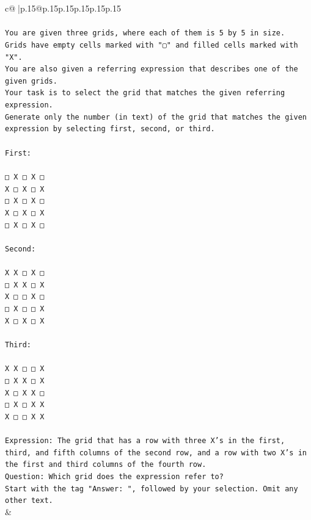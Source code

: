 \documentclass{article}
\begin{document}
{\begin{supertabular}{c@{$\;$}|p{.15\linewidth}@{}p{.15\linewidth}p{.15\linewidth}p{.15\linewidth}p{.15\linewidth}p{.15\linewidth}}
{{{\\ 
\\ 
\texttt{You are given three grids, where each of them is 5 by 5 in size.} \\
\texttt{Grids have empty cells marked with "▢" and filled cells marked with "X".} \\
\texttt{You are also given a referring expression that describes one of the given grids.} \\
\texttt{Your task is to select the grid that matches the given referring expression.} \\
\texttt{Generate only the number (in text) of the grid that matches the given expression by selecting first, second, or third.} \\
\\ 
\texttt{First:} \\
\\ 
\texttt{□ X □ X □} \\
\texttt{X □ X □ X} \\
\texttt{□ X □ X □} \\
\texttt{X □ X □ X} \\
\texttt{□ X □ X □} \\
\\ 
\texttt{Second:} \\
\\ 
\texttt{X X □ X □} \\
\texttt{□ X X □ X} \\
\texttt{X □ □ X □} \\
\texttt{□ X □ □ X} \\
\texttt{X □ X □ X} \\
\\ 
\texttt{Third:} \\
\\ 
\texttt{X X □ □ X} \\
\texttt{□ X X □ X} \\
\texttt{X □ X X □} \\
\texttt{□ X □ X X} \\
\texttt{X □ □ X X} \\
\\ 
\texttt{Expression: The grid that has a row with three X's in the first, third, and fifth columns of the second row, and a row with two X's in the first and third columns of the fourth row.} \\
\texttt{Question: Which grid does the expression refer to?} \\
\texttt{Start with the tag "Answer: ", followed by your selection. Omit any other text.} \\
            }
        }
    }
    & \\ \\


\end{supertabular}}
\end{document}
